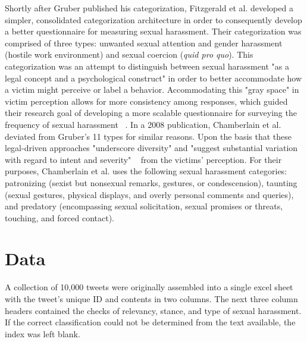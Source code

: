 Shortly after Gruber published his categorization, Fitzgerald et al. developed a simpler, consolidated categorization architecture in order to consequently develop a better questionnaire for measuring sexual harassment. Their categorization was comprised of three types: unwanted sexual attention and gender harassment (hostile work environment) and sexual coercion (\textit{quid pro quo}). This categorization was an attempt to distinguish between sexual harassment "as a legal concept and a psychological construct" in order to better accommodate how a victim might perceive or label a behavior. Accommodating this "gray space" in victim perception allows for more consistency among responses, which guided their research goal of developing a more scalable questionnaire for surveying the frequency of sexual harassment ~\cite{fitzgerald1995measuring}. In a 2008 publication, Chamberlain et al. deviated from Gruber's 11 types for similar reasons. Upon the basis that these legal-driven approaches "underscore diversity" and "suggest substantial variation with regard to intent and severity" ~\cite{chamberlain2008newcategories} from the victims' perception. For their purposes, Chamberlain et al. uses the following sexual harassment categories: patronizing (sexist but nonsexual remarks, gestures, or condescension), taunting (sexual gestures, physical displays, and overly personal comments and queries), and predatory (encompassing sexual solicitation, sexual promises or threats, touching, and forced contact).

\section{Data}

A collection of 10,000 tweets were originally assembled into a single excel sheet with the tweet's unique ID and contents in two columns. The next three column headers contained the checks of relevancy, stance, and type of sexual harassment. If the correct classification could not be determined from the text available, the index was left blank.

